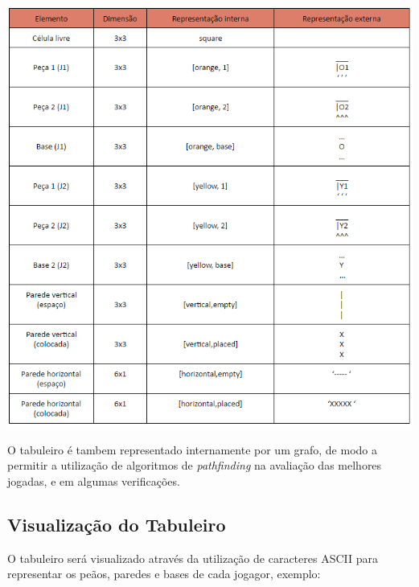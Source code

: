 \documentclass[a4paper]{article}
\begin{document}
\begin{center}
\includegraphics[scale = 0.64]{fig3.png}
\end{center}

O tabuleiro é tambem representado internamente por um grafo, de modo a permitir a utilização de algoritmos de \textit{pathfinding} na avaliação das melhores jogadas, e em algumas verificações.

\newpage
\subsection{Visualização do Tabuleiro} 
O tabuleiro será visualizado através da utilização de caracteres ASCII para representar os peãos, paredes e bases de cada jogagor, exemplo:
\end{document}
